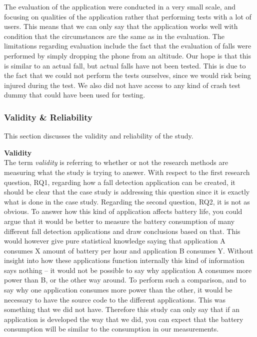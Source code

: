 \documentclass[12pt, a4paper, onecolumn]{article}
\newcommand{\parag}[1]{
	\textbf{#1} \hspace{0pt} \\
}
\begin{document}
	The evaluation of the application were conducted in a very small scale, and focusing on qualities of the application rather that performing tests with a lot of users. This means that we can only say that the application works well with condition that the circumstances are the same as in the evaluation. The limitations regarding evaluation include the fact that the evaluation of falls were performed by simply dropping the phone from an altitude. Our hope is that this is similar to an actual fall, but actual falls have not been tested. This is due to the fact that we could not perform the tests ourselves, since we would risk being injured during the test. We also did not have access to any kind of crash test dummy that could have been used for testing.
	
	\subsubsection{Validity \& Reliability}
	
	This section discusses the validity and reliability of the study.
	
	\parag{Validity}
	The term \textit{validity} is referring to whether or not the research methods are measuring what the study is trying to answer. With respect to the first research question, RQ1, regarding how a fall detection application can be created, it should be clear that the case study is addressing this question since it is exactly what is done in the case study. Regarding the second question, RQ2, it is not as obvious. To answer how this kind of application affects battery life, you could argue that it would be better to measure the battery consumption of many different fall detection applications and draw conclusions based on that. This would however give pure statistical knowledge saying that application A consumes X amount of battery per hour and application B consumes Y. Without insight into how these applications function internally this kind of information says nothing -- it would not be possible to say why application A consumes more power than B, or the other way around. To perform such a comparison, and to say why one application consumes more power than the other, it would be necessary to have the source code to the different applications. This was something that we did not have. Therefore this study can only say that if an application is developed the way that we did, you can expect that the battery consumption will be similar to the consumption in our measurements.
	
\end{document}
